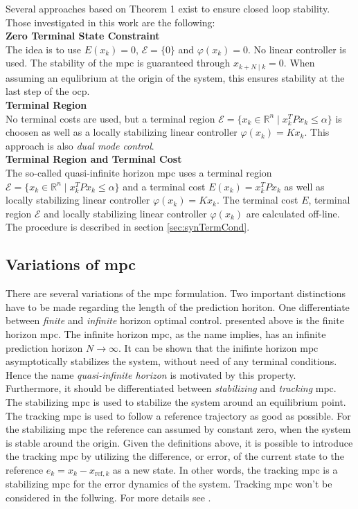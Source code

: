 \documentclass[10pt,a4paper]{article}
\begin{document}
Several approaches based on Theorem 1 exist to ensure closed loop stability. Those investigated in this work are the following:\\

\textbf{Zero Terminal State Constraint}\\
The idea is to use $E(x_k) = 0$, $\mathcal{E} = \{ 0 \}$ and $\varphi(x_{k}) = 0$. No linear controller is used.
The stability of the \gls{mpc} is guaranteed through $x_{k+N \mid k} = 0$. When assuming an equlibrium at the
origin of the system, this ensures stability at the last step of the \gls{ocp}.\\

\textbf{Terminal Region}\\
No terminal costs are used, but a terminal region $\mathcal{E} = \{x_k \in \mathbb{R}^n \mid x_k^TPx_k \leq \alpha \}$
is choosen as well as a locally stabilizing linear controller $\varphi(x_{k}) = K x_k$. This approach is also
\textit{dual mode control}.\\

\textbf{Terminal Region and Terminal Cost}\\
The so-called quasi-infinite horizon \gls{mpc} uses a terminal region $\mathcal{E} = \{x_k \in \mathbb{R}^n \mid x_k^TPx_k \leq \alpha \}$
and a terminal cost $E(x_k) = x_k^T P x_k$ as well as locally stabilizing linear controller $\varphi(x_{k}) = K x_k$.
The terminal cost $E$, terminal region $\mathcal{E}$ and locally stabilizing linear controller $\varphi(x_{k})$ are 
calculated off-line. The procedure is described in section \ref{sec:synTermCond}.


\subsection{Variations of \gls{mpc}}
There are several variations of the \gls{mpc} formulation. Two important distinctions have to be made regarding the length
of the prediction horiton. One differentiate between \textit{finite} and \textit{infinite} horizon optimal control. presented
above is the finite horizon \gls{mpc}. The infinite horizon \gls{mpc}, as the name implies, has an infinite prediction horizon
$N \rightarrow \infty$. It can be shown that the inifinte horizon \gls{mpc} asymptotically stabilizes the system, without need
of any terminal conditions. Hence the name \textit{quasi-infinite horizon} is motivated by this property.
Furthermore, it should be differentiated between \textit{stabilizing} and \textit{tracking} \gls{mpc}. The stabilizing \gls{mpc}
is used to stabilize the system around an equilibrium point. The tracking \gls{mpc} is used to follow
a reference trajectory as good as possible. For the stabilizing \gls{mpc} the reference can assumed by constant zero, when the 
system is stable around the origin. Given the definitions above, it is possible to introduce the tracking \gls{mpc} by utilizing
the difference, or error, of the current state to the reference $e_k = x_k - x_{\text{ref},k}$ as a new state. In other words,
the tracking \gls{mpc} is a stabilizing \gls{mpc} for the error dynamics of the system. Tracking \gls{mpc} won't be considered in
the follwing. For more details see \cite{nmpcBible}. 
\end{document}
